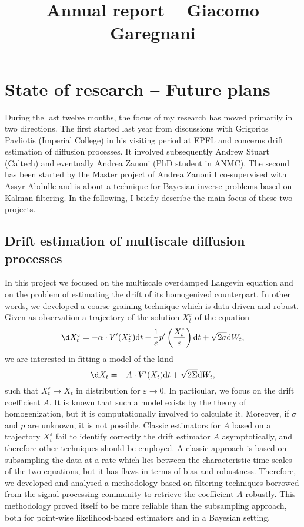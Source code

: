 \documentclass{article}
\title{Annual report -- Giacomo Garegnani}
\author{}
\date{}
\theoremstyle{theorem}
\theoremstyle{definition}
\newcommand{\epl}{\varepsilon}
\newcommand{\dd}{\mathrm{d}}
\begin{document}
\maketitle
	
\section{State of research -- Future plans}
	
During the last twelve months, the focus of my research has moved primarily in two directions. The first started last year from discussions with Grigorios Pavliotis (Imperial College) in his visiting period at EPFL and concerns drift estimation of diffusion processes. It involved subsequently Andrew Stuart (Caltech) and eventually Andrea Zanoni (PhD student in ANMC). The second has been started by the Master project of Andrea Zanoni I co-supervised with Assyr Abdulle and is about a technique for Bayesian inverse problems based on Kalman filtering. In the following, I briefly describe the main focus of these two projects.

\subsection{Drift estimation of multiscale diffusion processes}

In this project we focused on the multiscale overdamped Langevin equation and on the problem of estimating the drift of its homogenized counterpart. In other words, we developed a coarse-graining technique which is data-driven and robust. Given as observation a trajectory of the solution $X_t^\epl$ of the equation
\begin{equation}\label{eq:SDE_MS}
	\d X_t^\epl = -\alpha \cdot V'(X_t^\epl) \dd t - \frac1\epl p'\left(\frac{X_t^\epl}\epl\right) \dd t + \sqrt{2\sigma} \dd W_t,
\end{equation}
we are interested in fitting a model of the kind
\begin{equation}
	\d X_t = - A \cdot V'(X_t) \dd t + \sqrt{2\Sigma} \dd W_t,
\end{equation}
such that $X^\epl_t \to X_t$ in distribution for $\epl \to 0$. In particular, we focus on the drift coefficient $A$. It is known that such a model exists by the theory of homogenization, but it is computationally involved to calculate it. Moreover, if $\sigma$ and $p$ are unknown, it is not possible. Classic estimators for $A$ based on a trajectory $X^\epl_t$ fail to identify correctly the drift estimator $A$ asymptotically, and therefore other techniques should be employed. A classic approach is based on subsampling the data at a rate which lies between the characteristic time scales of the two equations, but it has flaws in terms of bias and robustness. Therefore, we developed and analysed a methodology based on filtering techniques borrowed from the signal processing community to retrieve the coefficient $A$ robustly. This methodology proved itself to be more reliable than the subsampling approach, both for point-wise likelihood-based estimators and in a Bayesian setting.
\end{document}
